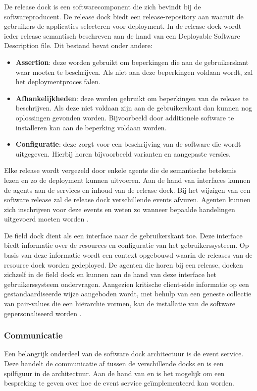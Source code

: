 De release dock is een softwarecomponent die zich bevindt bij de softwareproducent.
De release dock biedt een release-repository aan waaruit de gebruikers de applicaties selecteren voor deployment.
In de release dock wordt ieder release semantisch beschreven aan de hand van een Deployable Software Description file.
Dit bestand bevat onder andere:
\begin{itemize}
\item \textbf{Assertion}: deze worden gebruikt om beperkingen die aan de gebruikerskant waar moeten te beschrijven.
Als niet aan deze beperkingen voldaan wordt, zal het deploymentproces falen.
\item \textbf{Afhankelijkheden}: deze worden gebruikt om beperkingen van de release te beschrijven.
Als deze niet voldaan zijn aan de gebruikerskant dan kunnen nog oplossingen gevonden worden.
Bijvoorbeeld door additionele software te installeren kan aan de beperking voldaan worden.
\item \textbf{Configuratie}: deze zorgt voor een beschrijving van de software die wordt uitgegeven.
Hierbij horen bijvoorbeeld varianten en aangepaste versies.
\end{itemize}
Elke release wordt vergezeld door enkele agents die de semantische betekenis lezen en zo de deployment kunnen uitvoeren.
Aan de hand van interfaces kunnen de agents aan de services en inhoud van de release dock.
Bij het wijzigen van een software release zal de release dock verschillende events afvuren.
Agenten kunnen zich inschrijven voor deze events en weten zo wanneer bepaalde handelingen uitgevoerd moeten worden \citep{hall1999cooperative}.

De field dock dient als een interface naar de gebruikerskant toe.
Deze interface biedt informatie over de resources en configuratie van het gebruikerssysteem.
Op basis van deze informatie wordt een context opgebouwd waarin de releases van de resource dock worden gedeployed.
De agenten die horen bij een release, docken zichzelf in de field dock en kunnen aan de hand van deze interface het gebruikerssysteem ondervragen.
Aangezien kritische client-side informatie op een gestandaardiseerde wijze aangeboden wordt, met behulp van een geneste collectie van pair-values die een hiërarchie vormen, kan de installatie van de software gepersonaliseerd worden \citep{hall1999cooperative}.

\subsubsection{Communicatie}\label{sec:event}
Een belangrijk onderdeel van de software dock architectuur is de event service.
Deze handelt de communicatie af tussen de verschillende docks en is een spilfiguur in de architectuur.
Aan de hand van \citet{pietzuch2002hermes} en \citet{carzaniga2001design} is het mogelijk om een bespreking te geven over hoe de event service geïmplementeerd kan worden.

